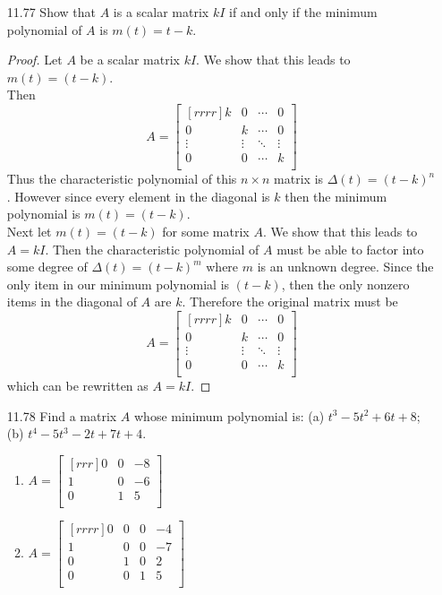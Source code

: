 \documentclass[12pt]{article}
\theoremstyle{definition}
\theoremstyle{plain}
\begin{document}
\begin{enumerate}
\item[11.77]Show that $A$ is a scalar matrix $kI$ if and only if the minimum polynomial of $A$ is $m(t)=t-k$.
\begin{proof}
Let $A$ be a scalar matrix $kI$. We show that this leads to $m(t)=(t-k)$.\\
Then 
\[ A=\begin{bmatrix}[rrrr]
k&0&\cdots&0\\
0&k&\cdots&0\\
\vdots&\vdots&\ddots&\vdots\\
0&0&\cdots&k\\\end{bmatrix} \]
Thus the characteristic polynomial of this $n\times n$ matrix is $\Delta(t) = (t-k)^n$. However since every element in the diagonal is $k$ then the minimum polynomial is $m(t) = (t-k)$.\\
Next let $m(t)=(t-k)$ for some matrix $A$. We show that this leads to $A = kI$. Then the characteristic polynomial of $A$ must be able to factor into some degree of $\Delta(t)=(t-k)^m$ where $m$ is an unknown degree. Since the only item in our minimum polynomial is $(t-k)$, then the only nonzero items in the diagonal of $A$ are $k$. Therefore the original matrix must be
\[ A=\begin{bmatrix}[rrrr]
k&0&\cdots&0\\
0&k&\cdots&0\\
\vdots&\vdots&\ddots&\vdots\\
0&0&\cdots&k\\\end{bmatrix} \]
which can be rewritten as $A=kI$.
\end{proof}
\item[11.78]Find a matrix $A$ whose minimum polynomial is: (a) $t^3-5t^2+6t+8$; (b) $t^4-5t^3-2t+7t+4$.
	\begin{enumerate}
	\item $A=\begin{bmatrix}[rrr]0&0&-8\\1&0&-6\\0&1&5\\\end{bmatrix}$
	\item $A=\begin{bmatrix}[rrrr]0&0&0&-4\\1&0&0&-7\\0&1&0&2\\0&0&1&5\\\end{bmatrix}$

\end{enumerate}
\end{enumerate}
\end{document}
